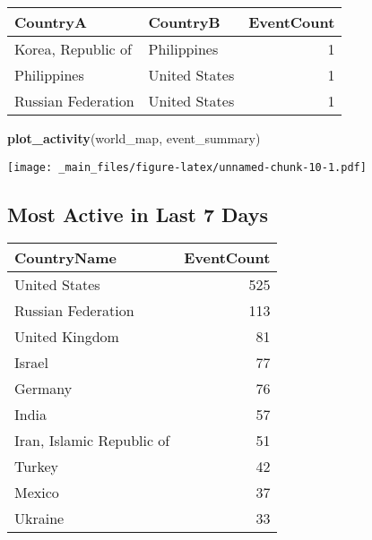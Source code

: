 \documentclass[]{article}
\newenvironment{Shaded}{\begin{snugshade}}{\end{snugshade}}
\newcommand{\KeywordTok}[1]{\textcolor[rgb]{0.13,0.29,0.53}{\textbf{{#1}}}}
\newcommand{\DataTypeTok}[1]{\textcolor[rgb]{0.13,0.29,0.53}{{#1}}}
\newcommand{\DecValTok}[1]{\textcolor[rgb]{0.00,0.00,0.81}{{#1}}}
\newcommand{\StringTok}[1]{\textcolor[rgb]{0.31,0.60,0.02}{{#1}}}
\newcommand{\NormalTok}[1]{{#1}}
\begin{document}
\begin{Shaded}
\end{Shaded}

\begin{tabular}{l|l|r}
\hline
CountryA & CountryB & EventCount\\
\hline
Korea, Republic of & Philippines & 1\\
\hline
Philippines & United States & 1\\
\hline
Russian Federation & United States & 1\\
\hline
\end{tabular}

\begin{Shaded}
\begin{Highlighting}[]
\KeywordTok{plot_activity}\NormalTok{(world_map, event_summary)}
\end{Highlighting}
\end{Shaded}

\texttt{[image: \_main\_files/figure-latex/unnamed-chunk-10-1.pdf]}

\subsection{Most Active in Last 7
Days}\label{most-active-in-last-7-days}

\begin{Shaded}
\end{Shaded}

\begin{tabular}{l|r}
\hline
CountryName & EventCount\\
\hline
United States & 525\\
\hline
Russian Federation & 113\\
\hline
United Kingdom & 81\\
\hline
Israel & 77\\
\hline
Germany & 76\\
\hline
India & 57\\
\hline
Iran, Islamic Republic of & 51\\
\hline
Turkey & 42\\
\hline
Mexico & 37\\
\hline
Ukraine & 33\\
\hline
\end{tabular}
\end{document}
